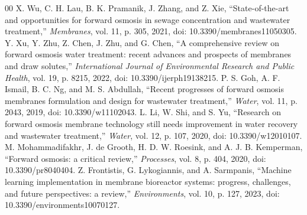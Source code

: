 \documentclass[journal, onecolumn, 12pt]{IEEEtran}
\begin{document}
\begin{thebibliography}{00}
 X. Wu, C. H. Lau, B. K. Pramanik, J. Zhang, and Z. Xie, ``State-of-the-art and opportunities for forward osmosis in sewage concentration and wastewater treatment,'' \textit{Membranes}, vol. 11, p. 305, 2021, doi: 10.3390/membranes11050305.
 Y. Xu, Y. Zhu, Z. Chen, J. Zhu, and G. Chen, ``A comprehensive review on forward osmosis water treatment: recent advances and prospects of membranes and draw solutes,'' \textit{International Journal of Environmental Research and Public Health}, vol. 19, p. 8215, 2022, doi: 10.3390/ijerph19138215.
 P. S. Goh, A. F. Ismail, B. C. Ng, and M. S. Abdullah, ``Recent progresses of forward osmosis membranes formulation and design for wastewater treatment,'' \textit{Water}, vol. 11, p. 2043, 2019, doi: 10.3390/w11102043.
 L. Li, W. Shi, and S. Yu, ``Research on forward osmosis membrane technology still needs improvement in water recovery and wastewater treatment,'' \textit{Water}, vol. 12, p. 107, 2020, doi: 10.3390/w12010107.
 M. Mohammadifakhr, J. de Grooth, H. D. W. Roesink, and A. J. B. Kemperman, ``Forward osmosis: a critical review,'' \textit{Processes}, vol. 8, p. 404, 2020, doi: 10.3390/pr8040404.
 Z. Frontistis, G. Lykogiannis, and A. Sarmpanis, ``Machine learning implementation in membrane bioreactor systems: progress, challenges, and future perspectives: a review,'' \textit{Environments}, vol. 10, p. 127, 2023, doi: 10.3390/environments10070127.
\end{thebibliography}
\end{document}
